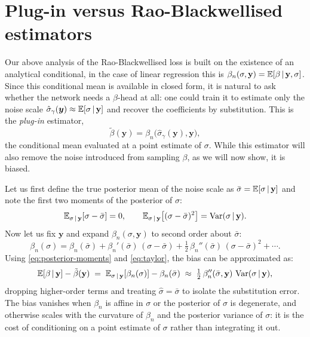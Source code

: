 \section{Plug-in versus Rao-Blackwellised estimators}
\label{sec:rb-vs-plugin}

Our above analysis of the Rao-Blackwellised loss is built on the existence of an analytical conditional, in the case of linear regression this is $\beta_n(\sigma, \mathbf{y}) = \mathbb{E}[\beta \,|\, \mathbf{y}, \sigma]$. Since this conditional mean is available in closed
form, it is natural to ask whether the network needs a $\beta$-head at all: one
could train it to estimate only the noise scale $\hat{\sigma}_\gamma(\bm y) \approx \mathbb{E}[\sigma \,|\, \mathbf{y}]$ and recover the
coefficients by substitution. This is the \emph{plug-in} estimator,
\begin{equation}
  \tilde{\beta}(\mathbf{y}) = \beta_n\big(\hat{\sigma}_\gamma(\mathbf{y}), \mathbf{y}\big),
\end{equation}
the conditional mean evaluated at a point estimate of $\sigma$. While this estimator will also remove the noise introduced from sampling $\beta$, as we will now show, it is biased.

Let us first define the true posterior mean of the noise scale as $\bar{\sigma} = \mathbb{E}[\sigma \,|\, \mathbf{y}]$ and note the first two moments of the posterior of $\sigma$:
%
\begin{equation*}
  \mathbb{E}_{\sigma\,|\,\mathbf{y}}[\sigma - \bar\sigma] = 0,
  \qquad
  \mathbb{E}_{\sigma\,|\,\mathbf{y}}\big[(\sigma - \bar\sigma)^2\big]
  = \operatorname{Var}(\sigma \,|\, \mathbf{y})
  \label{eq:posterior-moments}.
\end{equation*}
%
Now let us fix $\mathbf{y}$ and expand $\beta_n(\sigma, \mathbf{y})$ to second order about $\bar{\sigma}$:
%
\begin{equation}
  \beta_n(\sigma)
  = \beta_n(\bar\sigma)
    + \beta_n'(\bar\sigma)\,(\sigma - \bar\sigma)
    + \tfrac{1}{2}\,\beta_n''(\bar\sigma)\,(\sigma - \bar\sigma)^2
    + \cdots.
  \label{eq:taylor}
\end{equation}
%
Using \eqref{eq:posterior-moments} and \eqref{eq:taylor}, the bias can be approximated as:
%
\begin{equation}
  \mathbb{E}[\beta \,|\, \mathbf{y}] - \tilde{\beta}(\mathbf{y})
  \;=\;
  \mathbb{E}_{\sigma\,|\,\mathbf{y}}[\beta_n(\sigma)] - \beta_n(\bar\sigma)
  \;\approx\;
  \tfrac{1}{2}\,\beta_n''(\bar\sigma, \mathbf{y})\,\operatorname{Var}(\sigma \,|\, \mathbf{y}),
  \label{eq:plugin-bias}
\end{equation}
%
dropping higher-order terms and treating $\hat\sigma = \bar\sigma$ to
isolate the substitution error. The bias vanishes when $\beta_n$
is affine in $\sigma$ or the posterior of $\sigma$ is degenerate, and otherwise
scales with the curvature of $\beta_n$ and the posterior variance of $\sigma$: it
is the cost of conditioning on a point estimate of $\sigma$ rather than
integrating it out.

